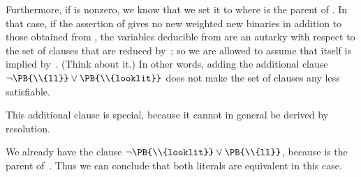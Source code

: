Furthermore, if  is
nonzero, we know that we
set it to  where  is the parent of %
.
In that case, if the assertion of  gives no new weighted
new binaries in addition to those obtained from , the variables
deducible from  are an autarky with respect to the
set of clauses that are reduced by~; so we are allowed to
assume that  itself is implied by~. (Think about
it.)
In other words,
adding the additional clause $\lnot\hbox{\PB{\\{ll}}}\lor\hbox{\PB{%
\\{looklit}}}$
does not make the set of clauses any less satisfiable.

This additional clause is special, because it cannot in general
be derived by resolution.

We already have the clause $\lnot\hbox{\PB{\\{looklit}}}\lor\hbox{\PB{%
\\{ll}}}$,
because  is the parent of~. Thus we can conclude
that
both literals are equivalent in this case.

